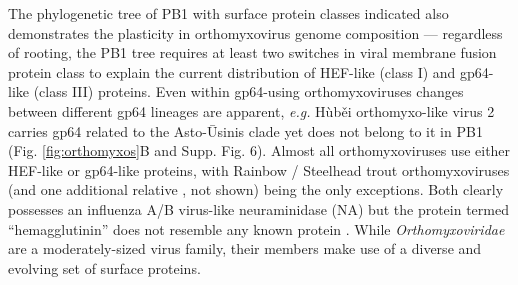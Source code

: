 \documentclass[11pt,twocolumn]{article}
\begin{document}
The phylogenetic tree of PB1 with surface protein classes indicated also demonstrates the plasticity in orthomyxovirus genome composition --- regardless of rooting, the PB1 tree requires at least two switches in viral membrane fusion protein class to explain the current distribution of HEF-like (class I) and gp64-like (class III) proteins.
Even within gp64-using orthomyxoviruses changes between different gp64 lineages are apparent, \textit{e.g.} H\`{u}b\v{e}i orthomyxo-like virus 2 carries gp64 related to the Asto-\={U}sinis clade yet does not belong to it in PB1 (Fig. \ref{fig:orthomyxos}B and Supp. Fig. 6).
Almost all orthomyxoviruses use either HEF-like or gp64-like proteins, with Rainbow / Steelhead trout orthomyxoviruses (and one additional relative \citep{batts_molecular_2017}, not shown) being the only exceptions. Both clearly possesses an influenza A/B virus-like neuraminidase (NA) but the protein termed ``hemagglutinin'' \citep{batts_molecular_2017} does not resemble any known protein \citep{finn_hmmer_2011}.
While \textit{Orthomyxoviridae} are a moderately-sized virus family, their members make use of a diverse and evolving set of surface proteins.
\end{document}

